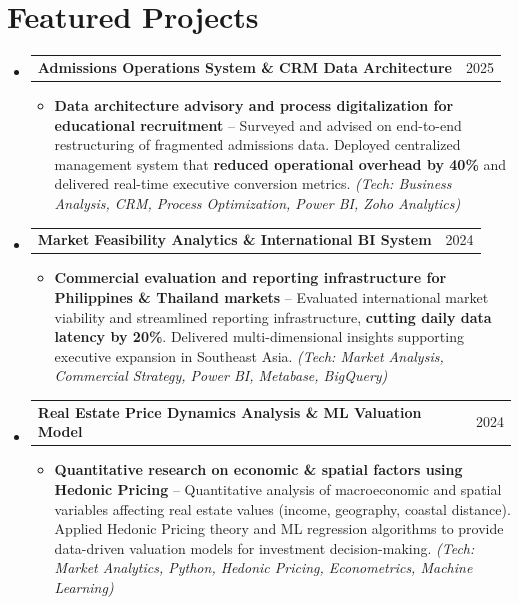 \documentclass[letterpaper,11pt]{article}
\makeatletter
\newcommand{\resumeItem}[1]{
  \item\small{
    {#1 \vspace{1pt}}
  }
}
\newcommand{\resumeProjectHeading}[2]{
    \vspace{2pt}\item
    \begin{tabular*}{\textwidth}{l@{\extracolsep{\fill}}r}
      \small#1 & #2 \\
    \end{tabular*}\vspace{-2pt}
}
\newcommand{\resumeSubHeadingListStart}{\begin{itemize}[leftmargin=0.15in, label={}]}
\newcommand{\resumeSubHeadingListEnd}{\end{itemize}}
\newcommand{\resumeItemListStart}{\begin{itemize}[leftmargin=0.15in, itemsep=2.5pt, topsep=2pt, parsep=1.5pt]}
\newcommand{\resumeItemListEnd}{\end{itemize}\vspace{2pt}}
\makeatother
\begin{document}
\section*{Featured Projects}
  \resumeSubHeadingListStart
        \resumeProjectHeading
      {\textbf{Admissions Operations System \& CRM Data Architecture}}{2025}
      \resumeItemListStart
        \resumeItem{\textbf{Data architecture advisory and process digitalization for educational recruitment} -- Surveyed and advised on end-to-end restructuring of fragmented admissions data. Deployed centralized management system that \textbf{reduced operational overhead by 40\%} and delivered real-time executive conversion metrics. \emph{(Tech: Business Analysis, CRM, Process Optimization, Power BI, Zoho Analytics)}}
      \resumeItemListEnd
    \resumeProjectHeading
      {\textbf{Market Feasibility Analytics \& International BI System}}{2024}
      \resumeItemListStart
        \resumeItem{\textbf{Commercial evaluation and reporting infrastructure for Philippines \& Thailand markets} -- Evaluated international market viability and streamlined reporting infrastructure, \textbf{cutting daily data latency by 20\%}. Delivered multi-dimensional insights supporting executive expansion in Southeast Asia. \emph{(Tech: Market Analysis, Commercial Strategy, Power BI, Metabase, BigQuery)}}
      \resumeItemListEnd
    \resumeProjectHeading
      {\textbf{Real Estate Price Dynamics Analysis \& ML Valuation Model}}{2024}
      \resumeItemListStart
        \resumeItem{\textbf{Quantitative research on economic \& spatial factors using Hedonic Pricing} -- Quantitative analysis of macroeconomic and spatial variables affecting real estate values (income, geography, coastal distance). Applied Hedonic Pricing theory and ML regression algorithms to provide data-driven valuation models for investment decision-making. \emph{(Tech: Market Analytics, Python, Hedonic Pricing, Econometrics, Machine Learning)}}
      \resumeItemListEnd
  \resumeSubHeadingListEnd

\end{document}

